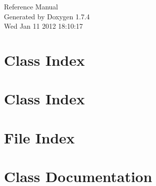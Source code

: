 \documentclass[a4paper]{book}
\begin{document}
\hypersetup{pageanchor=false}
\begin{titlepage}
\vspace*{7cm}
\begin{center}
{\Large Reference Manual}\\
\vspace*{1cm}
{\large Generated by Doxygen 1.7.4}\\
\vspace*{0.5cm}
{\small Wed Jan 11 2012 18:10:17}\\
\end{center}
\end{titlepage}
\clearemptydoublepage
{}
\tableofcontents
\clearemptydoublepage
{}
\hypersetup{pageanchor=true}
\chapter{Class Index}

\chapter{Class Index}

\chapter{File Index}

\chapter{Class Documentation}
















































\end{document}
